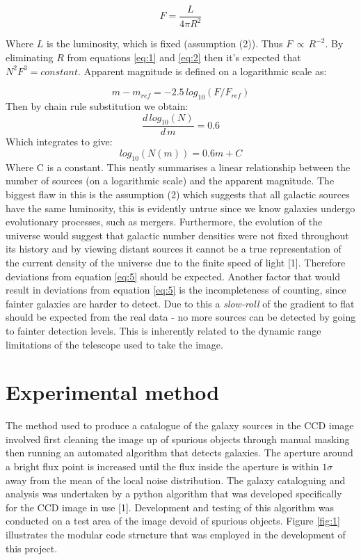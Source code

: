 \documentclass[journal]{IEEEtran}
\begin{document}
 \begin{equation}
     F = \frac{L}{4\pi R^2}
     \label{eq:2}
 \end{equation}
 
\noindent Where $L$ is the luminosity, which is fixed (assumption (2)). Thus $F\,\propto\,R^{-2}$. By eliminating $R$ from equations \ref{eq:1} and \ref{eq:2} then
it's expected that $N^{2}F^{3} = constant$. Apparent magnitude is defined on a logarithmic scale as:

\begin{equation}
    m - m_{ref} = -2.5\, log_{10}(F/F_{ref})
    \label{eq:3}
\end{equation}
\noindent Then by chain rule substitution we obtain:
\begin{equation}
    \frac{d\,log_{10}(N)}{d\,m} = 0.6
    \label{eq:4}
\end{equation}
Which integrates to give:
\begin{equation}
    log_{10}(N(m)) = 0.6m + C
    \label{eq:5}
\end{equation}
Where C is a constant. This neatly summarises a linear relationship between the number of sources (on a logarithmic scale) and the apparent magnitude. The biggest flaw in this is the assumption (2) which suggests that all galactic sources have the same luminosity, this is evidently untrue since we know galaxies undergo evolutionary processes, such as mergers. Furthermore, the evolution of the universe would suggest that galactic number densities were not fixed throughout its history and by viewing distant sources it cannot be a true representation of the current density of the universe due to the finite speed of light [1]. Therefore deviations from equation \ref{eq:5} should be expected. Another factor that would result in deviations from equation \ref{eq:5} is the incompleteness of counting, since fainter galaxies are harder to detect. Due to this a \textit{slow-roll} of the gradient to flat should be expected from the real data - no more sources can be detected by going to fainter detection levels. This is inherently related to the dynamic range limitations of the telescope used to take the image.
\section{Experimental method}
The method used to produce a catalogue of the galaxy sources in the CCD image involved first cleaning the image up of spurious objects through manual masking then running an automated algorithm that detects galaxies. The aperture around a bright flux point is increased until the flux inside the aperture is within $1\sigma$ away from the mean of the local noise distribution. The galaxy cataloguing and analysis was undertaken by a python algorithm that was developed specifically for the CCD image in use [1]. Development and testing of this algorithm was conducted on a test area of the image devoid of spurious objects. Figure \ref{fig:1} illustrates the modular code structure that was employed in the development of this project.\newline
\end{document}
